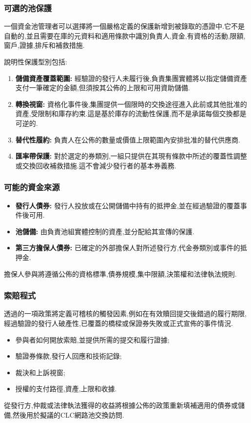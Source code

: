 \documentclass[11pt]{article}
\begin{document}
\subsubsection*{可選的池保護}

一個資金池管理者可以選擇將一個嚴格定義的保護新增到被錄取的憑證中.它不是自動的,並且需要在庫的元資料和適用條款中識別負責人,資金,有資格的活動,限額,窗戶,證據,排斥和補救措施.

說明性保護型別包括:

\begin{enumerate}[leftmargin=*]
\item \textbf{儲備資產覆蓋範圍:} 經驗證的發行人未履行後,負責集團實體將以指定儲備資產支付一筆確定的金額,但須按其公佈的上限和可用資助儲備.
\item \textbf{轉換視窗:} 資格化事件後,集團提供一個限時的交換途徑進入此前或其他批准的資產,受限制和庫存約束.這是基於庫存的流動性保護,而不是承諾每個交換都是可逆的.
\item \textbf{替代性履約:} 負責人在公佈的數量或價值上限範圍內安排批准的替代供應商.
\item \textbf{匯率帶保護:} 對於選定的券類別,一組只提供在其現有條款中所述的覆蓋性調整或交換回收補救措施.這不會減少發行者的基本券義務.
\end{enumerate}
\subsubsection*{可能的資金來源}

\begin{itemize}[leftmargin=*]
\item \textbf{發行人債券:} 發行人投放或在公開儲備中持有的抵押金,並在經過驗證的覆蓋事件後可用.
\item \textbf{池儲備:} 由負責池組實體控制的資產,並分配給其宣傳的保護.
\item \textbf{第三方擔保人債券:} 已確定的外部擔保人對所述發行方,代金券類別或事件的抵押金.
\end{itemize}
擔保人參與將遵循公佈的資格標準,債券規模,集中限額,決策權和法律執法規則.

\subsubsection*{索賠程式}

透過的一項政策將定義可稽核的觸發因素,例如在有效贖回提交後錯過的履行期限,經過驗證的發行人破產性,已覆蓋的橋樑或保證券失敗或正式宣佈的事件情況.

\begin{itemize}[leftmargin=*]
\item 參與者如何開放索賠,並提供所需的提交和履行證據;
\item 驗證券條款,發行人回應和技術記錄;
\item 裁決和上訴視窗;
\item 授權的支付路徑,資產,上限和收據.
\end{itemize}
從發行方,仲裁或法律執法獲得的收益將根據公佈的政策重新填補適用的債券或儲備,然後用於擬議的CLC網路池交換訪問.
\end{document}
